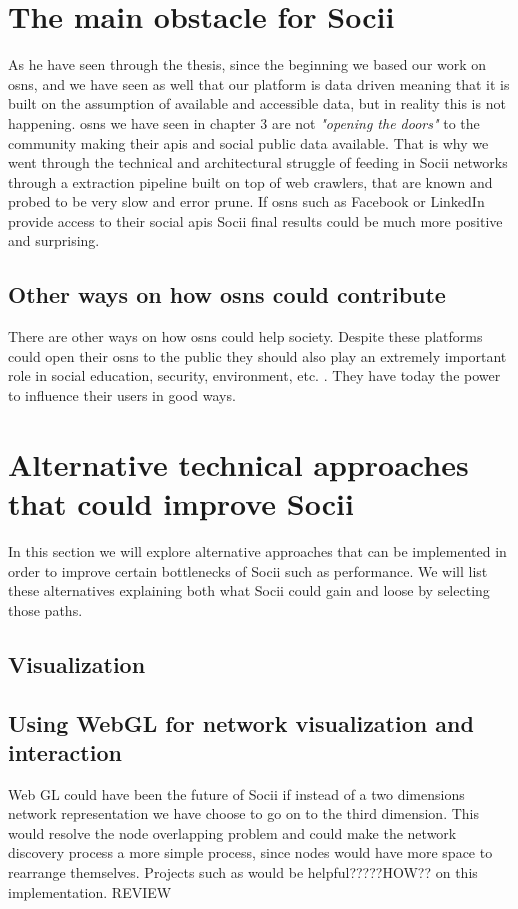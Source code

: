\section{The main obstacle for Socii}
As he have seen through the thesis, since the beginning we based our work on \glspl{osn}, and we have seen as well that our platform is data driven meaning that it is built on the assumption of available and accessible data, but in reality this is not happening. \glspl{osn} we have seen in chapter 3 are not \textit{"opening the doors"} to the community making their \glspl{api} and social public data available. That is why we went through the technical and architectural struggle of feeding in Socii networks through a extraction pipeline built on top of web crawlers, that are known and probed to be very slow and error prune. If \glspl{osn} such as Facebook or LinkedIn provide access to their social \glspl{api} Socii final results could be much more positive and surprising.

\subsection*{Other ways on how \glspl{osn} could contribute}
There are other ways on how \glspl{osn} could help society. Despite these platforms could open their \glspl{osn} to the public they should also play an extremely important role in social education, security, environment, etc. . They have today the power to influence their users in good ways.

\section{Alternative technical approaches that could improve Socii}
In this section we will explore alternative approaches that can be implemented in order to improve certain bottlenecks of Socii such as performance. We will list these alternatives explaining both what Socii could gain and loose by selecting those paths.

\subsection{Visualization}

\subsection*{Using WebGL for network visualization and interaction}
Web GL \citep{marrin2011webgl} could have been the future of Socii if instead of a two dimensions network representation we have choose to go on to the third dimension. This would resolve the node overlapping problem and could make the network discovery process a more simple process, since nodes would have more space to rearrange themselves. Projects such as \citep{graphosaurus} would be helpful?????HOW?? on this implementation. REVIEW

